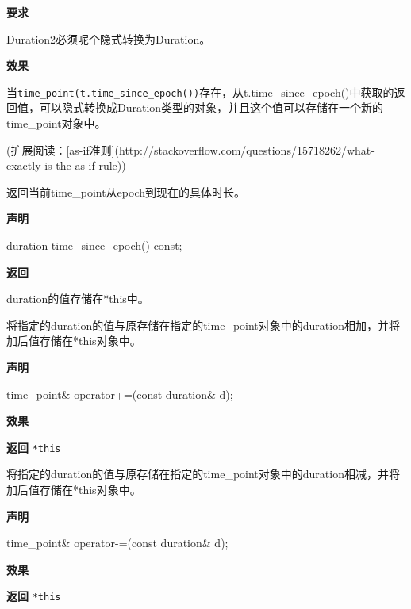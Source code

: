 \textbf{要求}

Duration2必须呢个隐式转换为Duration。

\textbf{效果}

当\texttt{time\_point(t.time\_since\_epoch())}存在，从t.time\_since\_epoch()中获取的返回值，可以隐式转换成Duration类型的对象，并且这个值可以存储在一个新的time\_point对象中。

(扩展阅读：[as-if准则](http://stackoverflow.com/questions/15718262/what-exactly-is-the-as-if-rule))


返回当前time\_point从epoch到现在的具体时长。

\textbf{声明}

\begin{cpp}
duration time_since_epoch() const;
\end{cpp}

\textbf{返回}

duration的值存储在*this中。


将指定的duration的值与原存储在指定的time\_point对象中的duration相加，并将加后值存储在*this对象中。

\textbf{声明}

\begin{cpp}
time_point& operator+=(const duration& d);
\end{cpp}

\textbf{效果}


\textbf{返回}
\texttt{*this}


将指定的duration的值与原存储在指定的time\_point对象中的duration相减，并将加后值存储在*this对象中。

\textbf{声明}

\begin{cpp}
time_point& operator-=(const duration& d);
\end{cpp}

\textbf{效果}


\textbf{返回}
\texttt{*this}


